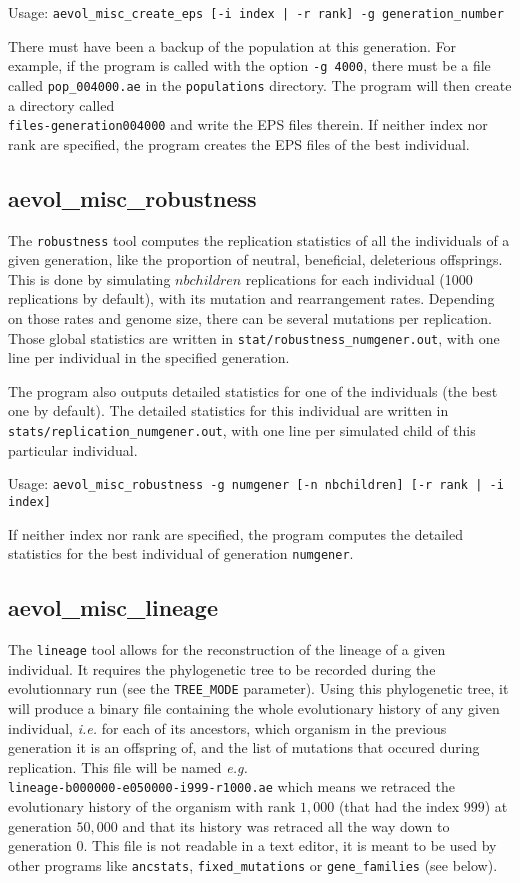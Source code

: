 Usage: \verb?aevol_misc_create_eps [-i index | -r rank] -g generation_number?

There must have been a backup of the population at this generation. For example, if the program is called with the option
\verb?-g 4000?, there must be a file called \verb?pop_004000.ae? in the \verb?populations? directory. The program will then create a directory called \\\verb?files-generation004000? and write the EPS files therein. If neither index nor rank are specified, the program creates the EPS files of the best individual.

\subsection{aevol\_misc\_robustness}
\label{sect:robustness}

The \verb?robustness? tool computes the replication statistics of all the individuals of a given generation, like the proportion of neutral, beneficial, deleterious offsprings. This is done by simulating $nbchildren$ replications for each individual (1000 replications by default), with its mutation and rearrangement rates. Depending on those rates and genome size, there can be several mutations per replication. Those global statistics are written in \verb?stat/robustness_numgener.out?, with one line per individual in the specified generation.

The program also outputs detailed statistics for one of the individuals (the best one by default). The detailed statistics for this individual are written in \verb?stats/replication_numgener.out?, with one line per simulated child of this particular individual.

Usage: \verb?aevol_misc_robustness -g numgener [-n nbchildren] [-r rank | -i index]?

If neither index nor rank are specified, the program computes the detailed statistics for the best individual of generation \verb?numgener?.


\subsection{aevol\_misc\_lineage}
\label{sect:lineage}
The \verb?lineage? tool allows for the reconstruction of the lineage of a given individual. It requires the phylogenetic tree to be recorded during the evolutionnary run (see the \verb?TREE_MODE? parameter). Using this phylogenetic tree, it will produce a binary file containing the whole evolutionary history of any given individual, \emph{i.e.} for each of its ancestors, which organism in the previous generation it is an offspring of, and the list of mutations that occured during replication. This file will be named \emph{e.g.} \\\verb?lineage-b000000-e050000-i999-r1000.ae? which means we retraced the evolutionary history of the organism with rank $1,000$ (that had the index $999$) at generation $50,000$ and that its history was retraced all the way down to generation $0$. This file is not readable in a text editor, it is meant to be used by other programs like \verb?ancstats?, \verb?fixed_mutations? or \verb?gene_families? (see below).


